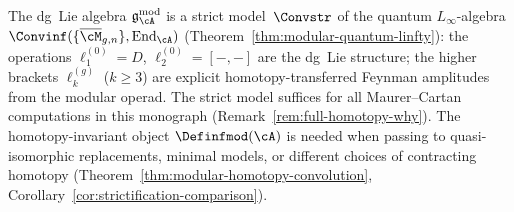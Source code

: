 \begin{remark}
\label{rem:modular-conv-strict-model}
\label{rem:homotopy-level-convolution}
The dg~Lie algebra $\mathfrak{g}_{\cA}^{\mathrm{mod}}$ is a strict
model~$\Convstr$ of the quantum $L_\infty$-algebra
$\Convinf(\{\overline{\cM}_{g,n}\}, \operatorname{End}_{\cA})$
\textup{(}Theorem~\textup{\ref{thm:modular-quantum-linfty}}):
the operations $\ell_1^{(0)} = D$, $\ell_2^{(0)} = [-,-]$ are the
dg~Lie structure; the higher brackets $\ell_k^{(g)}$ ($k \geq 3$)
are explicit homotopy-transferred Feynman amplitudes from the
modular operad.
The strict model suffices for all Maurer--Cartan computations in
this monograph
\textup{(}Remark~\textup{\ref{rem:full-homotopy-why})}.
The homotopy-invariant object $\Definfmod(\cA)$ is needed when
passing to quasi-isomorphic replacements, minimal models, or
different choices of contracting homotopy
\textup{(}Theorem~\textup{\ref{thm:modular-homotopy-convolution}},
Corollary~\textup{\ref{cor:strictification-comparison})}.
\end{remark}

